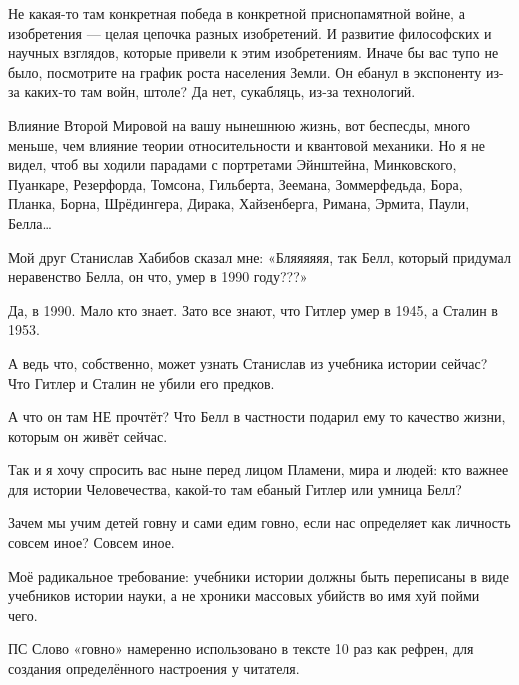 Не какая-то там конкретная победа в конкретной приснопамятной войне, а
изобретения — целая цепочка разных изобретений. И развитие философских и
научных взглядов, которые привели к этим изобретениям. Иначе бы вас тупо не
было, посмотрите на график роста населения Земли. Он ебанул в экспоненту из-за
каких-то там войн, штоле? Да нет, сукабляць, из-за технологий.

Влияние Второй Мировой на вашу нынешнюю жизнь, вот беспесды, много меньше, чем
влияние теории относительности и квантовой механики. Но я не видел, чтоб вы
ходили парадами с портретами Эйнштейна, Минковского, Пуанкаре, Резерфорда,
Томсона, Гильберта, Зеемана, Зоммерфедьда, Бора, Планка, Борна, Шрёдингера,
Дирака, Хайзенберга, Римана, Эрмита, Паули, Белла…

Мой друг Станислав Хабибов сказал мне: «Бляяяяяя, так Белл, который придумал
неравенство Белла, он что, умер в 1990 году???»

Да, в 1990. Мало кто знает. Зато все знают, что Гитлер умер в 1945, а Сталин в
1953.

А ведь что, собственно, может узнать Станислав из учебника истории сейчас? Что
Гитлер и Сталин не убили его предков.

А что он там НЕ прочтёт? Что Белл в частности подарил ему то качество жизни,
которым он живёт сейчас.

Так и я хочу спросить вас ныне перед лицом Пламени, мира и людей: кто важнее
для истории Человечества, какой-то там ебаный Гитлер или умница Белл?

Зачем мы учим детей говну и сами едим говно, если нас определяет как личность
совсем иное? Совсем иное.

Моё радикальное требование: учебники истории должны быть переписаны в виде
учебников истории науки, а не хроники массовых убийств во имя хуй пойми чего. 

ПС Слово «говно» намеренно использовано в тексте 10 раз как рефрен, для
создания определённого настроения у читателя.
